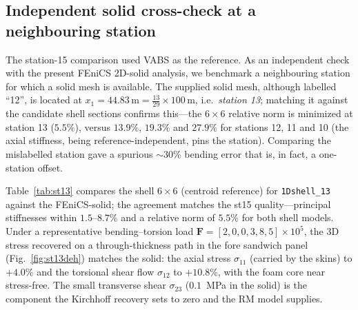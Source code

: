 \documentclass[preprint,12pt]{elsarticle}
\begin{document}
\subsection{Independent solid cross-check at a neighbouring station}
\label{sec:st13}
The station-15 comparison used VABS as the reference. As an independent check
with the present FEniCS 2D-solid analysis, we benchmark a neighbouring station
for which a solid mesh is available. The supplied solid mesh, although labelled
``12'', is located at $x_1=44.83\,\text{m}=\tfrac{13}{29}\times100\,\text{m}$,
i.e.\ \emph{station 13}; matching it against the candidate shell sections
confirms this---the $6\times6$ relative norm is minimized at station 13 ($5.5\%$),
versus $13.9\%$, $19.3\%$ and $27.9\%$ for stations 12, 11 and 10 (the axial
stiffness, being reference-independent, pins the station). Comparing the
mislabelled station gave a spurious $\sim$30\% bending error that is, in fact, a
one-station offset.

Table~\ref{tab:st13} compares the shell $6\times6$ (centroid reference) for
\texttt{1Dshell\_13} against the FEniCS-solid; the agreement matches the st15
quality---principal stiffnesses within $1.5$--$8.7\%$ and a relative norm of
$5.5\%$ for both shell models. Under a representative bending--torsion load
$\bm{F}=[2,0,0,3,8,5]\times10^5$, the 3D stress recovered on a through-thickness
path in the fore sandwich panel (Fig.~\ref{fig:st13deh}) matches the solid: the
axial stress $\sigma_{11}$ (carried by the skins) to $+4.0\%$ and the torsional
shear flow $\sigma_{12}$ to $+10.8\%$, with the foam core near stress-free. The
small transverse shear $\sigma_{23}$ ($0.1$~MPa in the solid) is the component
the Kirchhoff recovery sets to zero and the RM model supplies.
\end{document}
